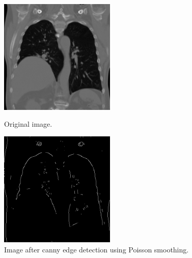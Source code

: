 \documentclass[a4paper,11pt]{article}
\begin{document}
\noindent
\begin{figure}[ht!]
    \begin{minipage}{0.5\textwidth}
        \centering
        \includegraphics[width=55mm]{0015.png}
        \caption{Original image.}
    \end{minipage}\hfill
    \begin{minipage}{0.5\textwidth}
        \centering
        \includegraphics[width=55mm]{0015_poisson.png}
        \caption{Image after canny edge detection using Poisson smoothing.}
    \end{minipage}\hfill
\end{figure}
\end{document}
